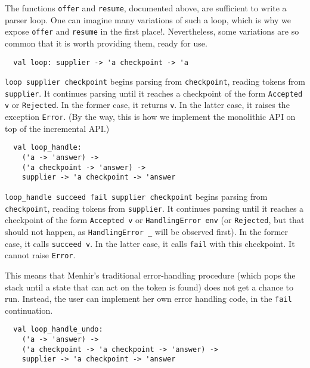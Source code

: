 \documentclass[onecolumn,11pt,nocopyrightspace,preprint]{sigplanconf}
\begin{document}

The functions \verb+offer+ and \verb+resume+, documented above, are sufficient
to write a parser loop. One can imagine many variations of such a loop, which
is why we expose \verb+offer+ and \verb+resume+ in the first place!.
Nevertheless, some variations are so common that it is worth providing them,
ready for use.


\begin{verbatim}
  val loop: supplier -> 'a checkpoint -> 'a
\end{verbatim}

\verb+loop supplier checkpoint+ begins parsing from \verb+checkpoint+, reading
tokens from \verb+supplier+. It continues parsing until it reaches a
checkpoint of the form \verb+Accepted v+ or \verb+Rejected+. In the former
case, it returns \verb+v+. In the latter case, it raises the
exception \verb+Error+. (By the way, this is how we implement the monolithic
API on top of the incremental API.)

\begin{verbatim}
  val loop_handle:
    ('a -> 'answer) ->
    ('a checkpoint -> 'answer) ->
    supplier -> 'a checkpoint -> 'answer
\end{verbatim}

\verb+loop_handle succeed fail supplier checkpoint+ begins parsing from
\verb+checkpoint+, reading tokens from \verb+supplier+. It continues parsing until
it reaches a checkpoint of the form \verb+Accepted v+ or \verb+HandlingError env+
(or \verb+Rejected+, but that should not happen, as \verb+HandlingError _+
will be observed first). In the former case, it calls \verb+succeed v+. In
the latter case, it calls \verb+fail+ with this checkpoint. It cannot
raise \verb+Error+.

This means that Menhir's traditional error-handling procedure (which pops the
stack until a state that can act on the \error token is found) does not get a
chance to run. Instead, the user can implement her own error handling code, in
the \verb+fail+ continuation.


\begin{verbatim}
  val loop_handle_undo:
    ('a -> 'answer) ->
    ('a checkpoint -> 'a checkpoint -> 'answer) ->
    supplier -> 'a checkpoint -> 'answer
\end{verbatim}
\end{document}
